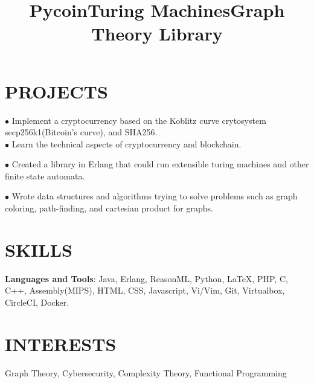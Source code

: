 \documentclass[margin]{res}
\begin{document}
\begin{resume}
\section{PROJECTS}
\employer{}
\location{}
\title{\textbf{Pycoin}}
\begin{position}
$\bullet$ Implement a cryptocurrency based on the Koblitz curve crytosystem secp256k1(Bitcoin's curve), and SHA256.\\
$\bullet$ Learn the technical aspects of cryptocurrency and blockchain.
\end{position}

\employer{}
\location{}
\title{\textbf{Turing Machines}}
\begin{position}
$\bullet$ Created a library in Erlang that could run extensible turing machines and other finite state automata.
\end{position}

\employer{}
\location{}
\title{\textbf{Graph Theory Library}}
\begin{position}
$\bullet$ Wrote data structures and algorithms trying to solve problems such as graph coloring, path-finding, and cartesian product for graphs.
\end{position}
\section{SKILLS}

\textbf{Languages and Tools}: Java, Erlang, ReasonML, Python, \LaTeX, PHP, C, C++, Assembly(MIPS), HTML, CSS, Javascript, Vi/Vim, Git, Virtualbox, CircleCI, Docker.
\\
\section{INTERESTS}
Graph Theory, Cybersecurity, Complexity Theory, Functional Programming
\end{resume}
\end{document}
